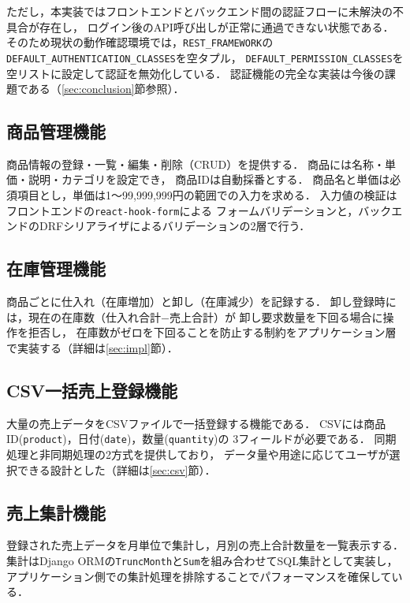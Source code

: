 \documentclass[submit,techrep]{ipsj}
\begin{document}
ただし，本実装ではフロントエンドとバックエンド間の認証フローに未解決の不具合が存在し，
ログイン後のAPI呼び出しが正常に通過できない状態である．
そのため現状の動作確認環境では，\texttt{REST\_FRAMEWORK}の
\texttt{DEFAULT\_AUTHENTICATION\_CLASSES}を空タプル，
\texttt{DEFAULT\_PERMISSION\_CLASSES}を空リストに設定して認証を無効化している．
認証機能の完全な実装は今後の課題である（\ref{sec:conclusion}節参照）．

\subsection{商品管理機能}

商品情報の登録・一覧・編集・削除（CRUD）を提供する．
商品には名称・単価・説明・カテゴリを設定でき，
商品IDは自動採番とする．
商品名と単価は必須項目とし，単価は1〜99,999,999円の範囲での入力を求める．
入力値の検証はフロントエンドの\texttt{react-hook-form}\cite{react-hook-form}による
フォームバリデーションと，バックエンドのDRFシリアライザによるバリデーションの2層で行う．

\subsection{在庫管理機能}

商品ごとに仕入れ（在庫増加）と卸し（在庫減少）を記録する．
卸し登録時には，現在の在庫数（仕入れ合計$-$売上合計）が
卸し要求数量を下回る場合に操作を拒否し，
在庫数がゼロを下回ることを防止する制約をアプリケーション層で実装する（詳細は\ref{sec:impl}節）．

\subsection{CSV一括売上登録機能}

大量の売上データをCSVファイルで一括登録する機能である．
CSVには商品ID(\texttt{product})，日付(\texttt{date})，数量(\texttt{quantity})の
3フィールドが必要である．
同期処理と非同期処理の2方式を提供しており，
データ量や用途に応じてユーザが選択できる設計とした（詳細は\ref{sec:csv}節）．

\subsection{売上集計機能}

登録された売上データを月単位で集計し，月別の売上合計数量を一覧表示する．
集計はDjango ORMの\texttt{TruncMonth}と\texttt{Sum}を組み合わせてSQL集計として実装し，
アプリケーション側での集計処理を排除することでパフォーマンスを確保している．
\end{document}
